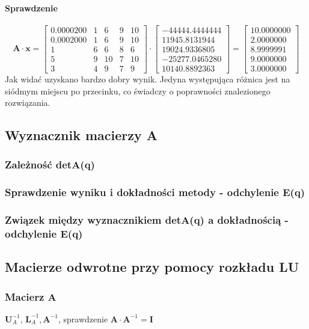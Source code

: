 \documentclass[a4paper]{article}
\begin{document}
\paragraph{Sprawdzenie}
$$
\textbf{A} \cdot \textbf{x} = 
\left[
\begin{array}{ccccc}
0.0000200&1&6&9&10\\ 
0.0002000&1&6&9&10\\ 
1&6&6&8&6\\ 
5&9&10&7&10\\ 
3&4&9&7&9
\end{array}
\right]
\cdot 
\left[
\begin{array}{c}
-44444.4444444\\ 
11945.8131944\\ 
19024.9336805\\ 
-25277.0465280\\ 
10140.8892363
\end{array}
\right]
= 
\left[
\begin{array}{c}
10.0000000\\ 
2.0000000\\ 
8.9999991\\ 
9.0000000\\ 
3.0000000
\end{array}
\right]
$$
Jak widać uzyskano bardzo dobry wynik. Jedyna występująca różnica jest na siódmym miejscu po przecinku, co świadczy o poprawności znalezionego rozwiązania.
\subsection{Wyznacznik macierzy A}
\subsubsection{Zależność detA(q)}
\subsubsection{Sprawdzenie wyniku i dokładności metody - odchylenie E(q)}
\subsubsection{Związek między wyznacznikiem detA(q) a dokładnością - odchylenie E(q)}
\subsection{Macierze odwrotne przy pomocy rozkładu LU}
\subsubsection{Macierz A}
$\textbf{U}_A^{-1}$, $\textbf{L}_A^{-1}, \textbf{A}^{-1}$, sprawdzenie $\textbf{A} \cdot \textbf{A}^{-1} = \textbf{I}$
\end{document}
